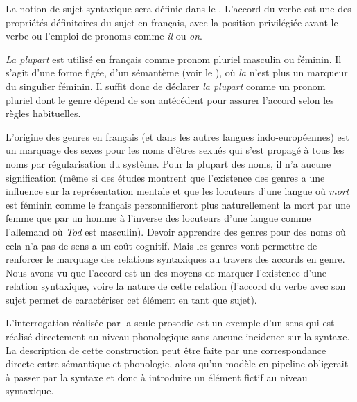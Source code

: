 {     La notion de sujet syntaxique sera définie dans le . L’accord du verbe est une des propriétés définitoires du sujet en français, avec la position privilégiée avant le verbe ou l’emploi de pronoms comme \textit{il} ou \textit{on}.

     \textit{La plupart} est utilisé en français comme pronom pluriel masculin ou féminin. Il s’agit d’une forme figée, d’un sémantème (voir le ), où \textit{la} n’est plus un marqueur du singulier féminin. Il suffit donc de déclarer \textit{la plupart} comme un pronom pluriel dont le genre dépend de son antécédent pour assurer l’accord selon les règles habituelles.

     L’origine des genres en français (et dans les autres langues indo-européennes) est un marquage des sexes pour les noms d’êtres sexués qui s’est propagé à tous les noms par régularisation du système. Pour la plupart des noms, il n’a aucune signification (même si des études montrent que l’existence des genres a une influence sur la représentation mentale et que les locuteurs d’une langue où \textit{mort} est féminin comme le français personnifieront plus naturellement la mort par une femme que par un homme à l’inverse des locuteurs d’une langue comme l’allemand où \textit{Tod} est masculin). Devoir apprendre des genres pour des noms où cela n’a pas de sens a un coût cognitif. Mais les genres vont permettre de renforcer le marquage des relations syntaxiques au travers des accords en genre. Nous avons vu que l’accord est un des moyens de marquer l’existence d’une relation syntaxique, voire la nature de cette relation (l’accord du verbe avec son sujet permet de caractériser cet élément en tant que sujet).

     L’interrogation réalisée par la seule prosodie est un exemple d’un sens qui est réalisé directement au niveau phonologique sans aucune incidence sur la syntaxe. La description de cette construction peut être faite par une correspondance directe entre sémantique et phonologie, alors qu’un modèle en pipeline obligerait à passer par la syntaxe et donc à introduire un élément fictif au niveau syntaxique.
}
